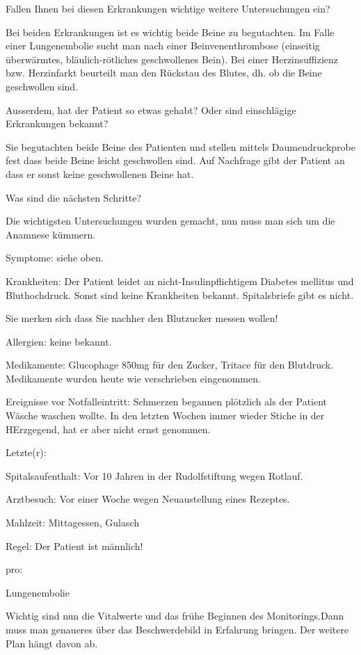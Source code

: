 \documentclass{article}
\begin{document}
Fallen Ihnen bei diesen Erkrankungen wichtige weitere Untersuchungen
ein?

Bei beiden Erkrankungen ist es wichtig beide Beine zu begutachten. Im
Falle einer Lungenembolie sucht man nach einer Beinvenenthrombose
(einseitig \"uberw\"armtes, bl\"aulich-r\"otliches geschwollenes Bein).
Bei einer Herzinsuffizienz bzw. Herzinfarkt beurteilt man den
R\"uckstau des Blutes, dh. ob die Beine geschwollen sind.

Ausserdem, hat der Patient so etwas gehabt? Oder sind einschl\"agige
Erkrankungen bekannt?  

Sie begutachten beide Beine des Patienten und stellen mittels
Daumendruckprobe fest dass beide Beine leicht geschwollen sind. Auf
Nachfrage gibt der Patient an dass er sonst keine geschwollenen Beine
hat. 

Was sind die n\"achsten Schritte?

Die wichtigsten Untersuchungen wurden gemacht, nun muss man sich um die
Anamnese k\"ummern. 

Symptome: siehe oben.

Krankheiten: Der Patient leidet an nicht-Insulinpflichtigem Diabetes
mellitus und Bluthochdruck. Sonst sind keine Krankheiten bekannt.
Spitalsbriefe gibt es nicht. 

Sie merken sich dass Sie nachher den Blutzucker messen wollen!

Allergien: keine bekannt.

Medikamente: Glucophage 850mg f\"ur den Zucker, Tritace f\"ur den
Blutdruck. Medikamente wurden heute wie verschrieben eingenommen. 

Ereignisse vor Notfalleintritt: Schmerzen begannen pl\"otzlich als der
Patient W\"asche waschen wollte. In den letzten Wochen immer wieder
Stiche in der HErzgegend, hat er aber nicht ernst genommen. 

Letzte(r):

Spitalsaufenthalt: Vor 10 Jahren in der Rudolfstiftung wegen Rotlauf.

Arztbesuch: Vor einer Woche wegen Neuaustellung eines Rezeptes.

Mahlzeit: Mittagessen, Gulasch

Regel: Der Patient ist m\"annlich!

pro:

Lungenembolie 

Wichtig sind nun die Vitalwerte und das fr\"uhe Beginnen des
Monitorings.Dann muss man genaueres \"uber das Beschwerdebild in
Erfahrung bringen. Der weitere Plan h\"angt davon ab.
\end{document}
